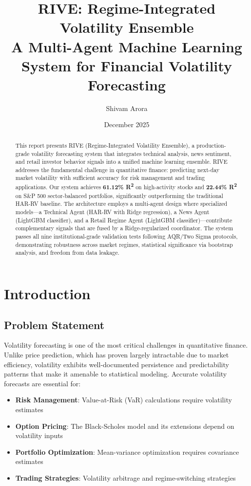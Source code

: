 \documentclass[12pt,a4paper]{article}
\title{\textbf{RIVE: Regime-Integrated Volatility Ensemble} \\
\large A Multi-Agent Machine Learning System for Financial Volatility Forecasting}
\author{Shivam Arora}
\date{December 2025}
\begin{document}
\maketitle

\begin{abstract}
This report presents RIVE (Regime-Integrated Volatility Ensemble), a production-grade volatility forecasting system that integrates technical analysis, news sentiment, and retail investor behavior signals into a unified machine learning ensemble. RIVE addresses the fundamental challenge in quantitative finance: predicting next-day market volatility with sufficient accuracy for risk management and trading applications. Our system achieves \textbf{61.12\% R\textsuperscript{2}} on high-activity stocks and \textbf{22.44\% R\textsuperscript{2}} on S\&P 500 sector-balanced portfolios, significantly outperforming the traditional HAR-RV baseline. The architecture employs a multi-agent design where specialized models—a Technical Agent (HAR-RV with Ridge regression), a News Agent (LightGBM classifier), and a Retail Regime Agent (LightGBM classifier)—contribute complementary signals that are fused by a Ridge-regularized coordinator. The system passes all nine institutional-grade validation tests following AQR/Two Sigma protocols, demonstrating robustness across market regimes, statistical significance via bootstrap analysis, and freedom from data leakage.
\end{abstract}

\tableofcontents
\newpage

\section{Introduction}

\subsection{Problem Statement}

Volatility forecasting is one of the most critical challenges in quantitative finance. Unlike price prediction, which has proven largely intractable due to market efficiency, volatility exhibits well-documented persistence and predictability patterns that make it amenable to statistical modeling. Accurate volatility forecasts are essential for:

\begin{itemize}
    \item \textbf{Risk Management}: Value-at-Risk (VaR) calculations require volatility estimates
    \item \textbf{Option Pricing}: The Black-Scholes model and its extensions depend on volatility inputs
    \item \textbf{Portfolio Optimization}: Mean-variance optimization requires covariance estimates
    \item \textbf{Trading Strategies}: Volatility arbitrage and regime-switching strategies
\end{itemize}
\end{document}
